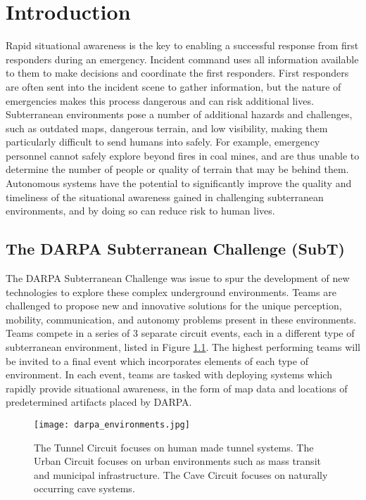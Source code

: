 \chapter{Introduction}

Rapid situational awareness is the key to enabling a successful response from first responders during an emergency. Incident command uses all information available to them to make decisions and coordinate the first responders. First responders are often sent into the incident scene to gather information, but the nature of emergencies makes this process dangerous and can risk additional lives. Subterranean environments pose a number of additional hazards and challenges, such as outdated maps, dangerous terrain, and low visibility, making them particularly difficult to send humans into safely. For example, emergency personnel cannot safely explore beyond fires in coal mines, and are thus unable to determine the number of people or quality of terrain that may be behind them. Autonomous systems have the potential to significantly improve the quality and timeliness of the situational awareness gained in challenging subterranean environments, and by doing so can reduce risk to human lives.


\section{The DARPA Subterranean Challenge (SubT)}

The DARPA Subterranean Challenge was issue to spur the development of new technologies to explore these complex underground environments. Teams are challenged to propose new and innovative solutions for the unique perception, mobility, communication, and autonomy problems present in these environments. Teams compete in a series of 3 separate circuit events, each in a different type of subterranean environment, listed in Figure \ref{darpa_environments}. The highest performing teams will be invited to a final event which incorporates elements of each type of environment. In each event, teams are tasked with deploying systems which rapidly provide situational awareness, in the form of map data and locations of predetermined artifacts placed by DARPA.

\begin{figure}	
	\centering
	\texttt{[image: darpa\_environments.jpg]}
	\caption[DARPA Subterranean Challenge environments]{The Tunnel Circuit focuses on human made tunnel systems. The Urban Circuit focuses on urban environments such as mass transit and municipal infrastructure. The Cave Circuit focuses on naturally occurring cave systems.}
	\label{darpa_environments}
\end{figure}

